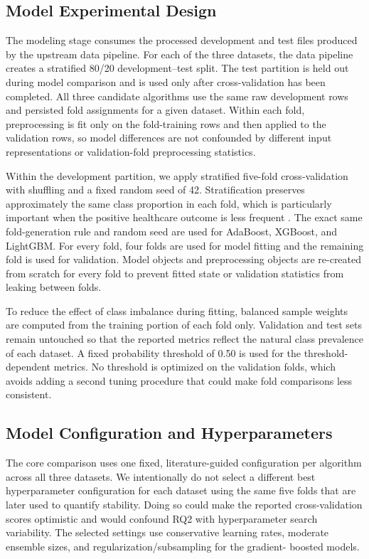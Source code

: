 \subsection{Model Experimental Design}

The modeling stage consumes the processed development and test files produced by
the upstream data pipeline. For each of the three datasets, the data pipeline
creates a stratified 80/20 development--test split. The test partition is held
out during model comparison and is used only after cross-validation has been
completed. All three candidate algorithms use the same raw development rows and
persisted fold assignments for a given dataset. Within each fold, preprocessing
is fit only on the fold-training rows and then applied to the validation rows,
so model differences are not confounded by different input representations or
validation-fold preprocessing statistics.

Within the development partition, we apply stratified five-fold
cross-validation with shuffling and a fixed random seed of 42. Stratification
preserves approximately the same class proportion in each fold, which is
particularly important when the positive healthcare outcome is less frequent
\cite{pedregosa2011scikit}. The exact same fold-generation rule and random seed
are used for AdaBoost, XGBoost, and LightGBM. For every fold, four folds are used
for model fitting and the remaining fold is used for validation. Model objects
and preprocessing objects are re-created from scratch for every fold to prevent
fitted state or validation statistics from leaking between folds.

To reduce the effect of class imbalance during fitting, balanced sample weights
are computed from the training portion of each fold only. Validation and test
sets remain untouched so that the reported metrics reflect the natural class
prevalence of each dataset. A fixed probability threshold of 0.50 is used for
the threshold-dependent metrics. No threshold is optimized on the validation
folds, which avoids adding a second tuning procedure that could make fold
comparisons less consistent.

\subsection{Model Configuration and Hyperparameters}

The core comparison uses one fixed, literature-guided configuration per
algorithm across all three datasets. We intentionally do not select a different
best hyperparameter configuration for each dataset using the same five folds
that are later used to quantify stability. Doing so could make the reported
cross-validation scores optimistic and would confound RQ2 with hyperparameter
search variability. The selected settings use conservative learning rates,
moderate ensemble sizes, and regularization/subsampling for the gradient-
boosted models.

